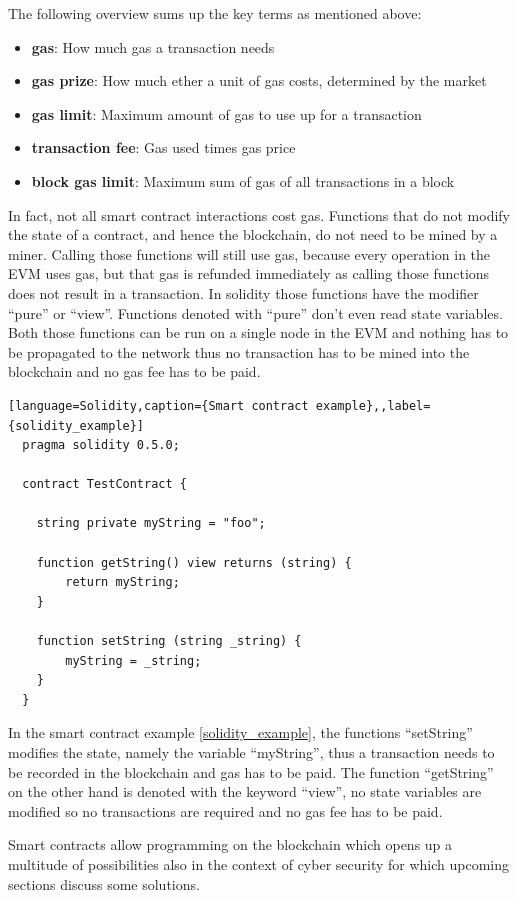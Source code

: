 The following overview sums up the key terms as mentioned above:
\begin{itemize}
  \item {\textbf{gas}: How much gas a transaction needs }
  \item {\textbf{gas prize}: How much ether a unit of gas costs, determined by the market}
  \item {\textbf{gas limit}: Maximum amount of gas to use up for a transaction}
  \item {\textbf{transaction fee}: Gas used times gas price}
  \item {\textbf{block gas limit}: Maximum sum of gas of all transactions in a block}

\end{itemize}

In fact, not all smart contract interactions cost gas. Functions that do not modify the state of a contract, and hence the blockchain, do not need to be mined by a miner.
Calling those functions will still use gas, because every operation in the EVM uses gas, but that gas is refunded immediately as calling those functions does not result in a transaction.
In solidity those functions have the modifier ``pure'' or ``view''. Functions denoted with ``pure'' don't even read state variables. Both those functions can be run on a single node in the EVM and
nothing has to be propagated to the network thus no transaction has to be mined into the blockchain and no gas fee has to be paid.

\begin{lstlisting}[language=Solidity,caption={Smart contract example},,label={solidity_example}]
  pragma solidity 0.5.0;

  contract TestContract {

    string private myString = "foo";

    function getString() view returns (string) {
        return myString;
    }

    function setString (string _string) {
        myString = _string;
    }
  }
  \end{lstlisting}

In the smart contract example \ref{solidity_example}, the functions ``setString'' modifies the state, namely the variable ``myString'', thus a transaction needs to be recorded in the blockchain and gas has to be paid.
The function ``getString'' on the other hand is denoted with the keyword ``view'', no state variables are modified so no transactions are required and no gas fee has to be paid.

Smart contracts allow programming on the blockchain which opens up a multitude of possibilities also in the context of cyber security for which upcoming sections discuss some solutions.
